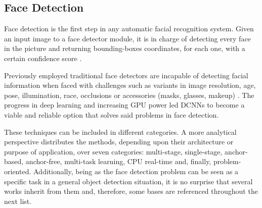 \documentclass[class=report, crop=false, a4paper, 12pt]{standalone}
\begin{document}
\subsection{Face Detection}
\par Face detection is the first step in any automatic facial recognition system. Given an input image to a face detector module, it is in charge of detecting every face in the picture and returning bounding-boxes coordinates, for each one, with a certain confidence score \autocite{duElementsEndtoendDeep2022,ranjanDeepLearningUnderstanding2018}.

\par Previously employed traditional face detectors  are incapable of detecting facial information when faced with challenges such as variants in image resolution, age, pose, illumination, race, occlusions or accessories (masks, glasses, makeup) \autocite{duElementsEndtoendDeep2022,ranjanDeepLearningUnderstanding2018}. The progress in deep learning and increasing GPU power led DCNNs to become a viable and reliable option that solves said problems in face detection. 

\par These techniques can be included in different categories. A more analytical perspective \autocite{duElementsEndtoendDeep2022} distributes the methods, depending upon their architecture or purpose of application, over seven categories: multi-stage, single-stage, anchor-based, anchor-free, multi-task learning, CPU real-time and, finally, problem-oriented. Additionally, being as the face detection problem can be seen as a specific task in a general object detection situation, it is no surprise that several works inherit from them and, therefore, some bases are referenced throughout the next list.
\end{document}
